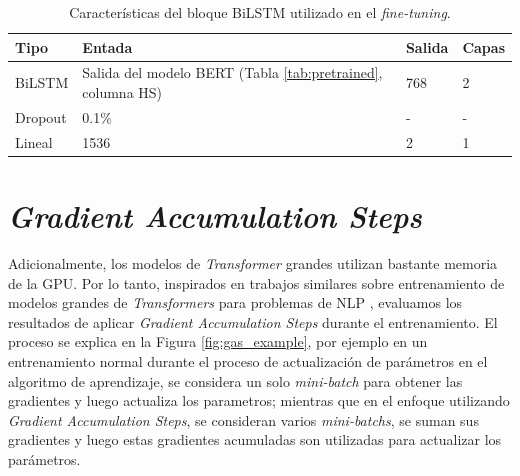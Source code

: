 \begin{table}[t]%
	\centering
	\caption{Características del bloque BiLSTM utilizado en el \textit{fine-tuning}.}
	\label{tab:biLSTM}%
	\setlength{\tabcolsep}{0.5em} %
	{\renewcommand{\arraystretch}{1.5}%
		\begin{tabular}{lp{9cm}p{1cm}p{1cm}}
			\textbf{Tipo}   & \textbf{Entada} & \textbf{Salida}& \textbf{Capas} \\ \hline
			
			BiLSTM & Salida del modelo BERT (Tabla \ref{tab:pretrained}, columna HS) & 768 & 2 \\ %
			
			Dropout & 0.1\% & - & - \\
			Lineal & 1536 & 2 & 1 \\ %
	\end{tabular}}
	
\end{table}





\section{\textit{Gradient Accumulation Steps}}\label{sec:gas}

Adicionalmente, los modelos de \textit{Transformer} grandes utilizan bastante memoria de la GPU. Por lo tanto, inspirados en trabajos similares sobre entrenamiento de modelos grandes de \textit{Transformers} para problemas de NLP \citep{anil2021large,zhang2023adam,huang2023measuring}, evaluamos los resultados de aplicar \textit{Gradient Accumulation Steps} durante el entrenamiento. El proceso se explica en la Figura \ref{fig:gas_example}, por ejemplo en un entrenamiento normal durante el proceso de actualización de parámetros en el algoritmo de aprendizaje, se considera un solo \textit{mini-batch} para obtener las gradientes y luego actualiza los parametros; mientras que en el enfoque utilizando \textit{Gradient Accumulation Steps}, se consideran varios \textit{mini-batchs}, se suman sus gradientes y luego estas gradientes acumuladas son utilizadas para actualizar los parámetros.



